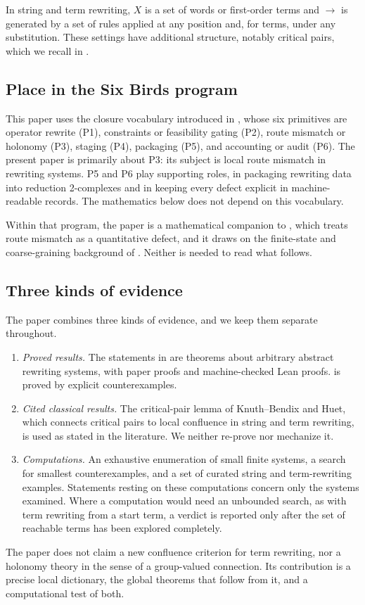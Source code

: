In string and term rewriting, $X$ is a set of words or first-order terms and $\to$ is generated by a set of rules applied at any position and, for terms, under any substitution. These settings have additional structure, notably critical pairs, which we recall in .

\subsection{Place in the Six Birds program}
\label{subsec:six-birds-placement}

\begin{remark}
\label{rem:six-birds-primitives}
This paper uses the closure vocabulary introduced in \cite{Tsiokos2026SixBirdsFoundations}, whose six primitives are operator rewrite (P1), constraints or feasibility gating (P2), route mismatch or holonomy (P3), staging (P4), packaging (P5), and accounting or audit (P6). The present paper is primarily about P3: its subject is local route mismatch in rewriting systems. P5 and P6 play supporting roles, in packaging rewriting data into reduction 2-complexes and in keeping every defect explicit in machine-readable records. The mathematics below does not depend on this vocabulary.
\end{remark}

Within that program, the paper is a mathematical companion to \cite{Tsiokos2026CountStone}, which treats route mismatch as a quantitative defect, and it draws on the finite-state and coarse-graining background of \cite{Tsiokos2026LayStone}. Neither is needed to read what follows.

\subsection{Three kinds of evidence}
\label{subsec:scope-evidence}

The paper combines three kinds of evidence, and we keep them separate throughout.

\begin{enumerate}
    \item \emph{Proved results.} The statements in  are theorems about arbitrary abstract rewriting systems, with paper proofs and machine-checked Lean proofs.  is proved by explicit counterexamples.
    \item \emph{Cited classical results.} The critical-pair lemma of Knuth--Bendix and Huet, which connects critical pairs to local confluence in string and term rewriting, is used as stated in the literature. We neither re-prove nor mechanize it.
    \item \emph{Computations.} An exhaustive enumeration of small finite systems, a search for smallest counterexamples, and a set of curated string and term-rewriting examples. Statements resting on these computations concern only the systems examined. Where a computation would need an unbounded search, as with term rewriting from a start term, a verdict is reported only after the set of reachable terms has been explored completely.
\end{enumerate}

The paper does not claim a new confluence criterion for term rewriting, nor a holonomy theory in the sense of a group-valued connection. Its contribution is a precise local dictionary, the global theorems that follow from it, and a computational test of both.
